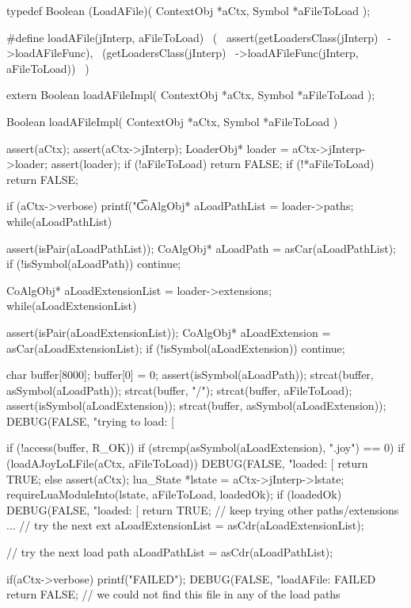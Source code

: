 \startCHeader
typedef Boolean (LoadAFile)(
  ContextObj *aCtx,
  Symbol     *aFileToLoad
);

#define loadAFile(jInterp, aFileToLoad)       \
  (                                           \
    assert(getLoadersClass(jInterp)           \
      ->loadAFileFunc),                       \
    (getLoadersClass(jInterp)                 \
      ->loadAFileFunc(jInterp, aFileToLoad))  \
  )
\stopCHeader

\setCHeaderStream{private}
\startCHeader
extern Boolean loadAFileImpl(
  ContextObj *aCtx,
  Symbol     *aFileToLoad
);
\stopCHeader
{}

\startCCode
Boolean loadAFileImpl(
  ContextObj *aCtx,
  Symbol     *aFileToLoad
) {
  assert(aCtx);
  assert(aCtx->jInterp);
  LoaderObj* loader = aCtx->jInterp->loader;
  assert(loader);
  if (!aFileToLoad) return FALSE;
  if (!*aFileToLoad) return FALSE;

  if (aCtx->verbose) printf("\t%

  CoAlgObj* aLoadPathList = loader->paths;
  while(aLoadPathList) {
    assert(isPair(aLoadPathList));
    CoAlgObj* aLoadPath = asCar(aLoadPathList);
    if (!isSymbol(aLoadPath)) continue;

    CoAlgObj* aLoadExtensionList = loader->extensions;
    while(aLoadExtensionList) {
      assert(isPair(aLoadExtensionList));
      CoAlgObj* aLoadExtension = asCar(aLoadExtensionList);
      if (!isSymbol(aLoadExtension)) continue;

      char buffer[8000];
      buffer[0] = 0;
      assert(isSymbol(aLoadPath));
      strcat(buffer, asSymbol(aLoadPath));
      strcat(buffer, "/");
      strcat(buffer, aFileToLoad);
      assert(isSymbol(aLoadExtension));
      strcat(buffer, asSymbol(aLoadExtension));
      DEBUG(FALSE, "trying to load: [%

      if (!access(buffer, R_OK)) {
        if (strcmp(asSymbol(aLoadExtension), ".joy") == 0) {
          if (loadAJoyLoLFile(aCtx, aFileToLoad)) {
            DEBUG(FALSE, "loaded: [%
            return TRUE;
          }
        } else {
          assert(aCtx);
          lua_State *lstate = aCtx->jInterp->lstate;
          requireLuaModuleInto(lstate, aFileToLoad, loadedOk);
          if (loadedOk) {
            DEBUG(FALSE, "loaded: [%
            return TRUE;
          }
        }
        // keep trying other paths/extensions ...
      }
      // try the next ext
      aLoadExtensionList = asCdr(aLoadExtensionList);
    }
    // try the next load path
    aLoadPathList = asCdr(aLoadPathList);
  }
  if(aCtx->verbose) printf("FAILED\n");
  DEBUG(FALSE, "loadAFile: FAILED%
  return FALSE; // we could not find this file in any of the load paths
}
\stopCCode


